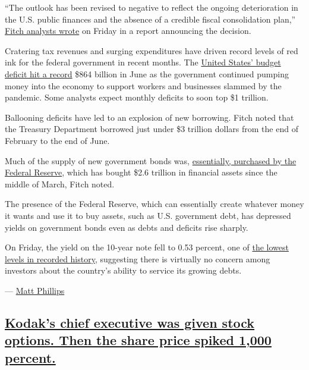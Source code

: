 ``The outlook has been revised to negative to reflect the ongoing
deterioration in the U.S. public finances and the absence of a credible
fiscal consolidation plan,''
\href{https://www.fitchratings.com/research/sovereigns/fitch-revises-united-states-outlook-to-negative-affirms-at-aaa-31-07-2020}{Fitch
analysts wrote} on Friday in a report announcing the decision.

Cratering tax revenues and surging expenditures have driven record
levels of red ink for the federal government in recent months. The
\href{https://www.nytimes.com/live/2020/07/13/business/stock-market-today-coronavirus\#the-us-budget-deficit-hits-another-monthly-record}{United
States' budget deficit hit a record} \$864 billion in June as the
government continued pumping money into the economy to support workers
and businesses slammed by the pandemic. Some analysts expect monthly
deficits to soon top \$1 trillion.

Ballooning deficits have led to an explosion of new borrowing. Fitch
noted that the Treasury Department borrowed just under \$3 trillion
dollars from the end of February to the end of June.

Much of the supply of new government bonds was,
\href{https://www.nytimes.com/2020/04/15/business/coronavirus-stimulus-money.html}{essentially,
purchased by the Federal Reserve}, which has bought \$2.6 trillion in
financial assets since the middle of March, Fitch noted.

The presence of the Federal Reserve, which can essentially create
whatever money it wants and use it to buy assets, such as U.S.
government debt, has depressed yields on government bonds even as debts
and deficits rise sharply.

On Friday, the yield on the 10-year note fell to 0.53 percent, one of
\href{https://www.marketwatch.com/story/10-year-treasury-yield-plunged-to-its-lowest-in-234-years-says-deutsche-bank-11596214464\#:~:text=The\%2010\%2Dyear\%20Treasury\%20note,scurrying\%20into\%20safe\%20haven\%20assets.}{the
lowest levels in recorded history}, suggesting there is virtually no
concern among investors about the country's ability to service its
growing debts.

--- \href{https://www.nytimes.com/by/matt-phillips}{Matt Phillips}

\hypertarget{kodaks-chief-executive-was-given-stock-options-then-the-share-price-spiked-1000-percent}{%
\subsection{\texorpdfstring{\protect\hyperlink{kodaks-chief-executive-was-given-stock-options-then-the-share-price-spiked-1000-percent}{Kodak's
chief executive was given stock options. Then the share price spiked
1,000
percent.}}{Kodak's chief executive was given stock options. Then the share price spiked 1,000 percent.}}\label{kodaks-chief-executive-was-given-stock-options-then-the-share-price-spiked-1000-percent}}

